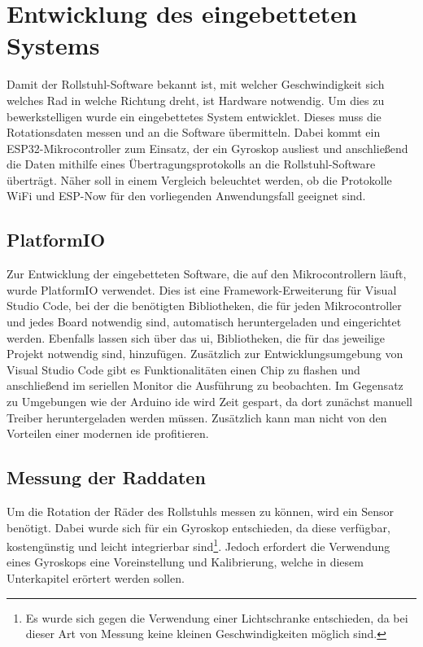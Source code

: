 \chapter{Entwicklung des eingebetteten Systems}
Damit der Rollstuhl-Software bekannt ist, mit welcher Geschwindigkeit sich welches Rad in welche Richtung dreht, ist Hardware notwendig.
Um dies zu bewerkstelligen wurde ein eingebettetes System entwicklet. Dieses muss die Rotationsdaten messen und an die Software übermitteln.
Dabei kommt ein ESP32-Mikrocontroller zum Einsatz, der ein Gyroskop ausliest und anschließend die Daten mithilfe eines Übertragungsprotokolls an die Rollstuhl-Software überträgt.
Näher soll in einem Vergleich beleuchtet werden, ob die Protokolle WiFi und ESP-Now für den vorliegenden Anwendungsfall geeignet sind.

\section{PlatformIO}
Zur Entwicklung der eingebetteten Software, die auf den Mikrocontrollern läuft, wurde PlatformIO verwendet.
Dies ist eine Framework-Erweiterung für Visual Studio Code, bei der die benötigten Bibliotheken, die für jeden Mikrocontroller und jedes Board notwendig sind, automatisch heruntergeladen und eingerichtet werden\cite{WhatPlatformIOPlatformIO}.
Ebenfalls lassen sich über das \ac{ui}, Bibliotheken, die für das jeweilige Projekt notwendig sind, hinzufügen.
Zusätzlich zur Entwicklungsumgebung von Visual Studio Code gibt es Funktionalitäten einen Chip zu flashen und anschließend im seriellen Monitor die Ausführung zu beobachten.
Im Gegensatz zu Umgebungen wie der Arduino \ac{ide} wird Zeit gespart, da dort zunächst manuell Treiber heruntergeladen werden müssen.
Zusätzlich kann man nicht von den Vorteilen einer modernen \ac{ide} profitieren.

\section{Messung der Raddaten}
Um die Rotation der Räder des Rollstuhls messen zu können, wird ein Sensor benötigt.
Dabei wurde sich für ein Gyroskop entschieden, da diese verfügbar, kostengünstig und leicht integrierbar sind\footnote{Es wurde sich gegen die Verwendung einer Lichtschranke entschieden, da bei dieser Art von Messung keine kleinen Geschwindigkeiten möglich sind.}.
Jedoch erfordert die Verwendung eines Gyroskops eine Voreinstellung und Kalibrierung, welche in diesem Unterkapitel erörtert werden sollen.

